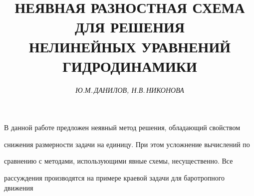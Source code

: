 

 




 


\newcommand{\A}{{\cal A}} 


\newcommand{\col}{\operatorname{col}} 


\newcommand{\vraisup}{\operatorname{vrai~sup}} 


 


\setcounter{page}{20} 








\author{\it Ю.М.\,ДАНИЛОВ, Н.В.\,НИКОНОВА} 


\title{НЕЯВНАЯ РАЗНОСТНАЯ СХЕМА ДЛЯ РЕШЕНИЯ\\ 


НЕЛИНЕЙНЫХ УРАВНЕНИЙ ГИДРОДИНАМИКИ} 


 




\date{} 


\pagestyle{plain} 


 


 


\maketitle 


 


 


В данной работе предложен неявный метод решения, обладающий свойством 


снижения размерности задачи на единицу. При этом усложнение вычислений по 


сравнению с методами, использующими явные схемы, несущественно. Все 


рассуждения производятся на примере краевой задачи для баротропного движения 



